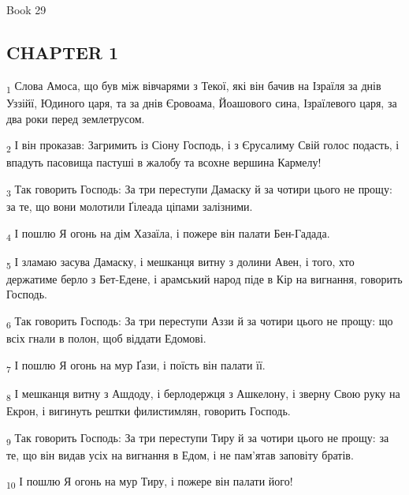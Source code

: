 Book 29
\subsection{CHAPTER 1}
\begin{tcolorbox}
\textsubscript{1} Слова Амоса, що був між вівчарями з Текої, які він бачив на Ізраїля за днів Уззійї, Юдиного царя, та за днів Єровоама, Йоашового сина, Ізраїлевого царя, за два роки перед землетрусом.
\end{tcolorbox}
\begin{tcolorbox}
\textsubscript{2} І він проказав: Загримить із Сіону Господь, і з Єрусалиму Свій голос подасть, і впадуть пасовища пастуші в жалобу та всохне вершина Кармелу!
\end{tcolorbox}
\begin{tcolorbox}
\textsubscript{3} Так говорить Господь: За три переступи Дамаску й за чотири цього не прощу: за те, що вони молотили Ґілеада ціпами залізними.
\end{tcolorbox}
\begin{tcolorbox}
\textsubscript{4} І пошлю Я огонь на дім Хазаїла, і пожере він палати Бен-Гадада.
\end{tcolorbox}
\begin{tcolorbox}
\textsubscript{5} І зламаю засува Дамаску, і мешканця витну з долини Авен, і того, хто держатиме берло з Бет-Едене, і арамський народ піде в Кір на вигнання, говорить Господь.
\end{tcolorbox}
\begin{tcolorbox}
\textsubscript{6} Так говорить Господь: За три переступи Аззи й за чотири цього не прощу: що всіх гнали в полон, щоб віддати Едомові.
\end{tcolorbox}
\begin{tcolorbox}
\textsubscript{7} І пошлю Я огонь на мур Ґази, і поїсть він палати її.
\end{tcolorbox}
\begin{tcolorbox}
\textsubscript{8} І мешканця витну з Ашдоду, і берлодержця з Ашкелону, і зверну Свою руку на Екрон, і вигинуть рештки филистимлян, говорить Господь.
\end{tcolorbox}
\begin{tcolorbox}
\textsubscript{9} Так говорить Господь: За три переступи Тиру й за чотири цього не прощу: за те, що він видав усіх на вигнання в Едом, і не пам'ятав заповіту братів.
\end{tcolorbox}
\begin{tcolorbox}
\textsubscript{10} І пошлю Я огонь на мур Тиру, і пожере він палати його!
\end{tcolorbox}
